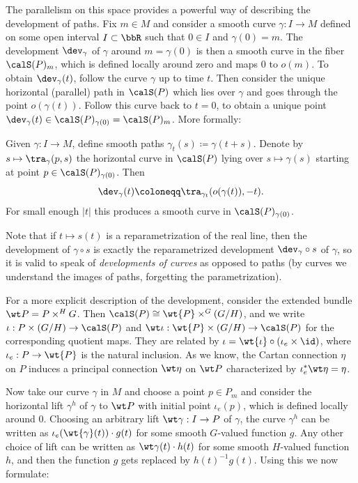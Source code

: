 The parallelism on this space provides a powerful way of describing the development of paths. Fix $m\in M$ and consider a smooth curve $\gamma:I\to M$ defined on some open interval $I\subset\bbR$ such that $0\in I$ and $\gamma(0)=m$. The development $\dev_\gamma$ of $\gamma$ around $m=\gamma(0)$ is then a smooth curve in the fiber $\calS(P)_m$, which is defined locally around zero and maps $0$ to $o(m)$. To obtain $\dev_\gamma(t)$, follow the curve $\gamma$ up to time $t$. Then consider the unique horizontal (parallel) path in $\calS(P)$ which lies over $\gamma$ and goes through the point $o(\gamma(t))$. Follow this curve back to $t=0$, to obtain a unique point $\dev_\gamma(t)\in\calS(P)_{\gamma(0)}=\calS(P)_m$. More formally:


\begin{defn}
    Given $\gamma:I\to M$, define smooth paths $\gamma_t(s)\coloneqq \gamma(t+s)$. Denote by $s\mapsto \tra_{\gamma}(p,s)$ the horizontal curve in $\calS(P)$ lying over $s\mapsto \gamma(s)$ starting at point $p\in \calS(P)_{\gamma(0)}$. Then \[\dev_\gamma(t)\coloneqq\tra_{\gamma_t}(o(\gamma(t)),-t).\]
    For small enough $|t|$ this produces a smooth curve in $\calS(P)_{\gamma(0)}$.
\end{defn}

Note that if $t\mapsto s(t)$ is a reparametrization of the real line, then the development of $\gamma\circ s$ is exactly the reparametrized development $\dev_\gamma\circ s$  of $\gamma$, so it is valid to speak of \emph{developments of curves} as opposed to paths (by curves we understand the images of paths, forgetting the parametrization). 

For a more explicit description of the development, consider the extended bundle $\wt P=P\times^H G$. Then $\calS(P)\cong \wt{P}\times^G (G\slash H)$, and we write $\iota:P\times (G\slash H)\to \calS(P)$ and $\wt \iota:\wt{P}\times(G\slash H)\to \calS(P)$ for the corresponding quotient maps. They are related by $\iota=\wt{\iota}\circ (\iota_e\times\id)$, where $\iota_e:P\to \wt{P}$ is the natural inclusion. As we know, the Cartan connection $\eta$ on $P$ induces a principal connection $\wt \eta$ on $\wt P$ characterized by $\iota_e^\ast\wt\eta=\eta$.

Now take our curve $\gamma$ in $M$ and choose a point $p\in P_m$ and consider the horizontal lift $\gamma^h$ of $\gamma$ to $\wt P$ with initial point $\iota_e(p)$, which is defined locally around $0$. Choosing an arbitrary lift $\wt \gamma:I\to P$ of $\gamma$, the curve $\gamma^h$ can be written as $\iota_e(\wt{\gamma}(t))\cdot g(t)$ for some smooth $G$-valued function $g$. Any other choice of lift can be written as $\wt\gamma(t)\cdot h(t)$ for some smooth $H$-valued function $h$, and then the function $g$ gets replaced by $h(t)^{-1}g(t)$. Using this we now formulate:

